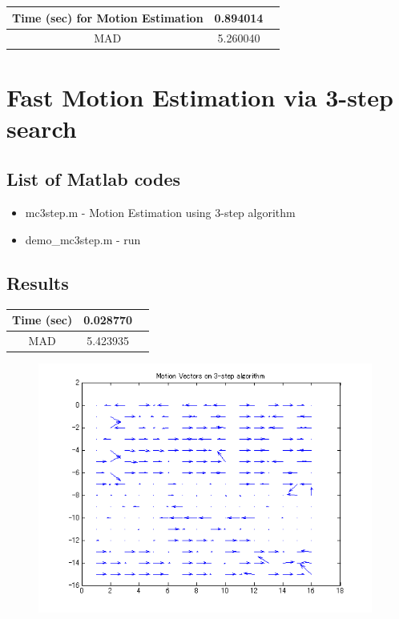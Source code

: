 \documentclass[article,oneside]{memoir}
\begin{document}
 \begin{center}
  \begin{tabular}{@{} |c|c|c| @{}}
  \hline
  Time (sec) for Motion Estimation & 0.894014  \\
  \hline
  MAD & 5.260040 \\
  \hline
  \end{tabular}
\end{center}

\newpage

\section{Fast Motion Estimation via 3-step search}

\subsection{List of Matlab codes}

\begin{itemize}
\item mc3step.m - Motion Estimation using 3-step algorithm
\item demo\_mc3step.m - run
\end{itemize}

\subsection{Results}

 \begin{center}
  \begin{tabular}{@{} |c|c|c| @{}}
  \hline
  Time (sec) & 0.028770 \\
  \hline
  MAD & 5.423935 \\
  \hline
  \end{tabular}
\end{center}


\begin{figure}[ht]
\begin{center}
\includegraphics[width=11cm]{../images/motionfield3step.png}
\end{center}
\end{figure}
\end{document}
